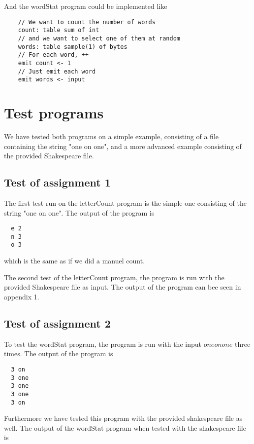\documentclass[10pt, a4paper]{article}
\begin{document}
And the wordStat program could be implemented like


\begin{lstlisting}
	// We want to count the number of words
	count: table sum of int
	// and we want to select one of them at random
	words: table sample(1) of bytes
	// For each word, ++
	emit count <- 1
	// Just emit each word
	emit words <- input
\end{lstlisting}

               


\section{Test programs}
We have tested both programs on a simple example, consisting of a file containing the string "one on one", and a more advanced example consisting of the provided Shakespeare file.

\subsection{Test of assignment 1} %
\label{sub:assignment_1}
The first test run on the letterCount program is the simple one consisting of the string "one on one". The output of the program is
\begin{verbatim}
  e	2
  n	3
  o	3
\end{verbatim}
which is the same as if we did a manuel count.

The second test of the letterCount program, the program is run with the provided Shakespeare file as input. The output of the program can bee seen in appendix 1.

\subsection{Test of assignment 2} %
\label{sub:assignment_2}

To test the wordStat program, the program is run with the input $one on one$ three times. The output of the program is

\begin{verbatim}  
  3 on
  3 one
  3 one
  3 one    
  3 on  
\end{verbatim}

Furthermore we have tested this program with the provided shakespeare file as well. The output of the wordStat program when tested with the shakespeare file is
\end{document}

